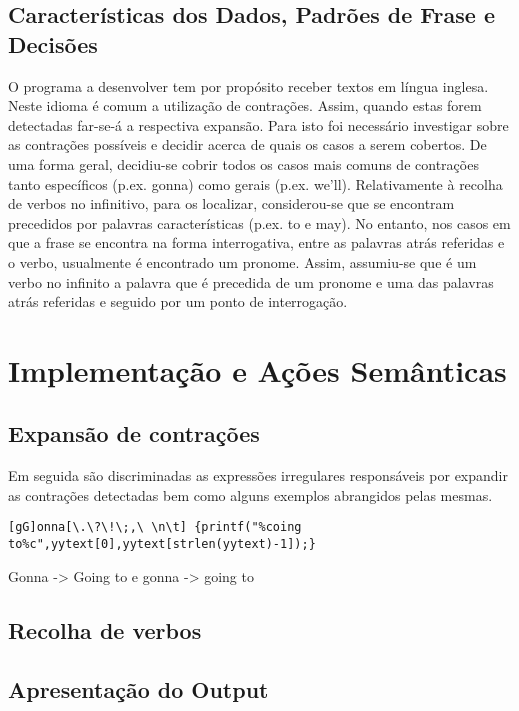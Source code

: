 \documentclass{report}
\begin{document}
\section*{Características dos Dados, Padr\~oes de Frase e Decisões}

O programa a desenvolver tem por propósito receber textos em língua inglesa. Neste idioma é comum a utilização de contrações. Assim, quando estas forem detectadas far-se-á a respectiva expansão. Para isto foi necessário investigar sobre as contrações possíveis e decidir acerca de quais os casos a serem cobertos. De uma forma geral, decidiu-se cobrir todos os casos mais comuns de contrações tanto específicos (p.ex. gonna) como gerais (p.ex. we’ll).
Relativamente à recolha de verbos no infinitivo, para os localizar, considerou-se que se encontram precedidos por palavras características (p.ex. to e may). No entanto, nos casos em que a frase se encontra na forma interrogativa, entre as palavras atrás referidas e o verbo, usualmente é encontrado um pronome. Assim, assumiu-se que é um verbo no infinito a palavra que é precedida de um pronome e uma das palavras atrás referidas e seguido por um ponto de interrogação.

\chapter{Implementação e Ações Semânticas} \label{ae}
\section{Expansão de contrações}
Em seguida são discriminadas as expressões irregulares responsáveis por expandir as contrações detectadas bem como alguns exemplos abrangidos pelas mesmas.
\\
\begin{verbatim}
[gG]onna[\.\?\!\;,\ \n\t] {printf("%coing to%c",yytext[0],yytext[strlen(yytext)-1]);}
\end{verbatim}
Gonna -> Going to      e 	gonna -> going to
\\

\section{Recolha de verbos}

\section{Apresentação do Output}
\end{document}
